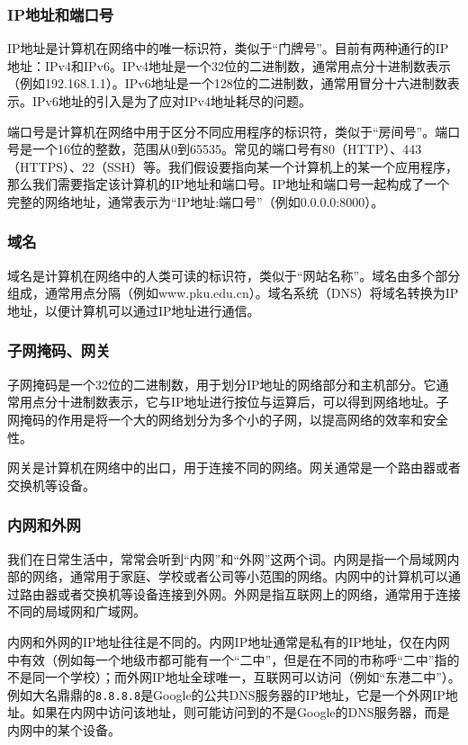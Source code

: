 \documentclass[../main.tex]{subfiles}
\begin{document}
\subsubsection{IP地址和端口号}
IP地址是计算机在网络中的唯一标识符，类似于“门牌号”。目前有两种通行的IP地址：IPv4和IPv6。IPv4地址是一个32位的二进制数，通常用点分十进制数表示（例如192.168.1.1）。IPv6地址是一个128位的二进制数，通常用冒分十六进制数表示。IPv6地址的引入是为了应对IPv4地址耗尽的问题。

端口号是计算机在网络中用于区分不同应用程序的标识符，类似于“房间号”。端口号是一个16位的整数，范围从0到65535。常见的端口号有80（HTTP）、443（HTTPS）、22（SSH）等。我们假设要指向某一个计算机上的某一个应用程序，那么我们需要指定该计算机的IP地址和端口号。IP地址和端口号一起构成了一个完整的网络地址，通常表示为“IP地址:端口号”（例如0.0.0.0:8000）。

\subsubsection{域名}
域名是计算机在网络中的人类可读的标识符，类似于“网站名称”。域名由多个部分组成，通常用点分隔（例如www.pku.edu.cn）。域名系统（DNS）将域名转换为IP地址，以便计算机可以通过IP地址进行通信。

\subsubsection{子网掩码、网关}

子网掩码是一个32位的二进制数，用于划分IP地址的网络部分和主机部分。它通常用点分十进制数表示，它与IP地址进行按位与运算后，可以得到网络地址。子网掩码的作用是将一个大的网络划分为多个小的子网，以提高网络的效率和安全性。

网关是计算机在网络中的出口，用于连接不同的网络。网关通常是一个路由器或者交换机等设备。

\subsubsection{内网和外网}

我们在日常生活中，常常会听到“内网”和“外网”这两个词。内网是指一个局域网内部的网络，通常用于家庭、学校或者公司等小范围的网络。内网中的计算机可以通过路由器或者交换机等设备连接到外网。外网是指互联网上的网络，通常用于连接不同的局域网和广域网。

内网和外网的IP地址往往是不同的。内网IP地址通常是私有的IP地址，仅在内网中有效（例如每一个地级市都可能有一个“二中”，但是在不同的市称呼“二中”指的不是同一个学校）；而外网IP地址全球唯一，互联网可以访问（例如“东港二中”）。例如大名鼎鼎的\texttt{8.8.8.8}是Google的公共DNS服务器的IP地址，它是一个外网IP地址。如果在内网中访问该地址，则可能访问到的不是Google的DNS服务器，而是内网中的某个设备。
\end{document}
